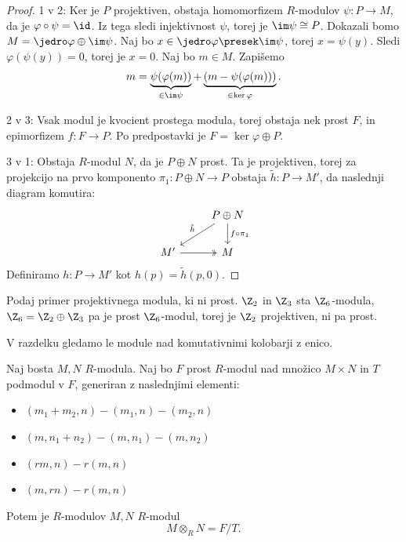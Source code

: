 \begin{proof}
  1 v 2:
  Ker je $P$ projektiven, obstaja homomorfizem $R$-modulov $\psi: P \to M$, da
  je $\varphi \circ \psi = \id$.
  Iz tega sledi injektivnost $\psi$, torej je $\im \psi \cong P$.
  Dokazali bomo $M = \jedro \varphi \oplus \im \psi$.
  Naj bo $x \in \jedro \varphi \presek \im \psi$, torej $x = \psi(y)$.
  Sledi $\varphi(\psi(y)) = 0$, torej je $x = 0$.
  Naj bo $m \in M$.
  Zapišemo
  \[
	m = \underbrace{\psi(\varphi(m))}_{\in \im \psi}
	+ \underbrace{(m - \psi(\varphi(m)))}_{\in \ker \varphi}.
  \]

  2 v 3:
  Vsak modul je kvocient prostega modula, torej obstaja nek prost $F$, in
  epimorfizem $f: F \to P$.
  Po predpostavki je $F = \ker \varphi \oplus P$.

  3 v 1:
  Obstaja $R$-modul $N$, da je $P \oplus N$ prost.
  Ta je projektiven, torej za projekcijo na prvo komponento $\pi_1 : P \oplus N
  \to P$ obstaja $\tilde{h}: P \to M'$, da naslednji diagram komutira:
  \[\begin{tikzcd}
	  & {P \oplus N} \\
	  {M'} & M
	  \arrow["{\tilde{h}}"', from=1-2, to=2-1]
	  \arrow["{f \circ \pi_1}", from=1-2, to=2-2]
	  \arrow[two heads, from=2-1, to=2-2]
	\end{tikzcd}\]
  Definiramo $h: P \to M'$ kot $h(p) = \tilde{h}(p,0)$.
\end{proof}


\begin{vo}{Podaj primer projektivnega modula, ki ni prost.}
  $\Z_2$ in $\Z_3$ sta $\Z_6$-modula, $\Z_6 = \Z_2 \oplus \Z_3$ pa je prost
  $\Z_6$-modul, torej je $\Z_2$ projektiven, ni pa prost.
\end{vo}


V razdelku gledamo le module nad komutativnimi kolobarji z enico.

\begin{definicija}
  Naj bosta $M, N$ $R$-modula.
  Naj bo $F$ prost $R$-modul nad množico $M \times N$ in $T$ podmodul v $F$,
  generiran z naslednjimi elementi:
  \begin{itemize}
  \item $(m_1 + m_2, n) - (m_1, n) - (m_2, n)$
  \item $(m, n_1 + n_2) - (m, n_1) - (m, n_2)$
  \item $(rm, n) - r(m, n)$
  \item $(m, rn) - r(m, n)$
  \end{itemize}
  Potem je  $R$-modulov $M, N$ $R$-modul
  \[
	M \otimes_R N = F/T.
  \]
\end{definicija}

